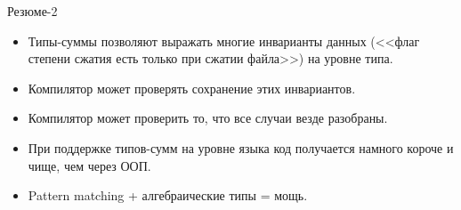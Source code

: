 \begin{frame}{Резюме-2}
	\begin{itemize}
		\item
			Типы-суммы позволяют выражать многие инварианты данных (<<флаг степени сжатия есть только при сжатии файла>>) на уровне типа.
		\item
			Компилятор может проверять сохранение этих инвариантов.
		\item
			Компилятор может проверить то, что все случаи везде разобраны.
		\item
			При поддержке типов-сумм на уровне языка код получается намного короче и чище, чем через ООП.
		\item
			Pattern matching + алгебраические типы = мощь.
	\end{itemize}
\end{frame}
